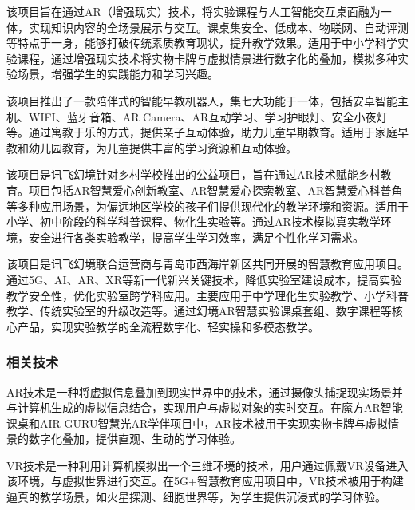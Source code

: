 
该项目旨在通过AR（增强现实）技术，将实验课程与人工智能交互桌面融为一体，实现知识内容的全场景展示与交互。课桌集安全、低成本、物联网、自动评测等特点于一身，能够打破传统素质教育现状，提升教学效果。适用于中小学科学实验课程，通过增强现实技术将实物卡牌与虚拟情景进行数字化的叠加，模拟多种实验场景，增强学生的实践能力和学习兴趣。


该项目推出了一款陪伴式的智能早教机器人，集七大功能于一体，包括安卓智能主机、WIFI、蓝牙音箱、AR Camera、AR互动学习、学习护眼灯、安全小夜灯等。通过寓教于乐的方式，提供亲子互动体验，助力儿童早期教育。适用于家庭早教和幼儿园教育，为儿童提供丰富的学习资源和互动体验。


该项目是讯飞幻境针对乡村学校推出的公益项目，旨在通过AR技术赋能乡村教育。项目包括AR智慧爱心创新教室、AR智慧爱心探索教室、AR智慧爱心科普角等多种应用场景，为偏远地区学校的孩子们提供现代化的教学环境和资源。适用于小学、初中阶段的科学科普课程、物化生实验等。通过AR技术模拟真实教学环境，安全进行各类实验教学，提高学生学习效率，满足个性化学习需求。


该项目是讯飞幻境联合运营商与青岛市西海岸新区共同开展的智慧教育应用项目。通过5G、AI、AR、XR等新一代新兴关键技术，降低实验室建设成本，提高实验教学安全性，优化实验室跨学科应用。主要应用于中学理化生实验教学、小学科普教学、传统实验室的升级改造等。通过幻境AR智慧实验课桌套组、数字课程等核心产品，实现实验教学的全流程数字化、轻实操和多模态教学。

\subsubsection{相关技术}


AR技术是一种将虚拟信息叠加到现实世界中的技术，通过摄像头捕捉现实场景并与计算机生成的虚拟信息结合，实现用户与虚拟对象的实时交互。在魔方AR智能课桌和AIR GURU智慧光AR学伴项目中，AR技术被用于实现实物卡牌与虚拟情景的数字化叠加，提供直观、生动的学习体验。


VR技术是一种利用计算机模拟出一个三维环境的技术，用户通过佩戴VR设备进入该环境，与虚拟世界进行交互。在5G+智慧教育应用项目中，VR技术被用于构建逼真的教学场景，如火星探测、细胞世界等，为学生提供沉浸式的学习体验。

